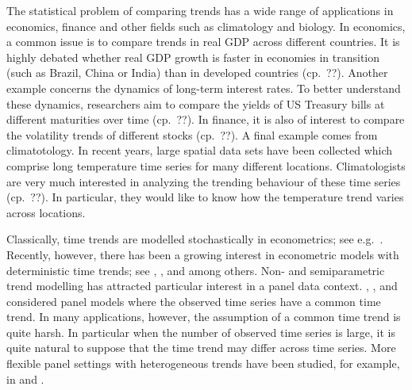 \documentclass[a4paper,12pt]{article}
\begin{document}
The statistical problem of comparing trends has a wide range of applications in economics, finance and other fields such as climatology and biology. In economics, a common issue is to compare trends in real GDP across different countries. It is highly debated whether real GDP growth is faster in economies in transition (such as Brazil, China or India) than in developed countries (cp.\ ??). Another example concerns the dynamics of long-term interest rates. To better understand these dynamics, researchers aim to compare the yields of US Treasury bills at different maturities over time (cp.\ ??). In finance, it is also of interest to compare the volatility trends of different stocks (cp.\ ??). A final example comes from climatotology. In recent years, large spatial data sets have been collected which comprise long temperature time series for many different locations. Climatologists are very much interested in analyzing the trending behaviour of these time series (cp.\ ??). In particular, they would like to know how the temperature trend varies across locations. 


Classically, time trends are modelled stochastically in econometrics; see e.g.\ \cite{Stock1988}. Recently, however, there has been a growing interest in econometric models with deterministic time trends; see \cite{Cai2007}, \cite{Atak2011}, \cite{Robinson2012} and \cite{ChenGaoLi2012} among others. Non- and semiparametric trend modelling has attracted particular interest in a panel data context. \cite{LiChenGao2010}, \cite{Atak2011}, \cite{Robinson2012} and \cite{ChenGaoLi2012} considered panel models where the observed time series have a common time trend. In many applications, however, the assumption of a common time trend is quite harsh. In particular when the number of observed time series is large, it is quite natural to suppose that the time trend may differ across time series. More flexible panel settings with heterogeneous trends have been studied, for example, in \cite{Zhang2012} and \cite{Hidalgo2014}. 
\end{document}
